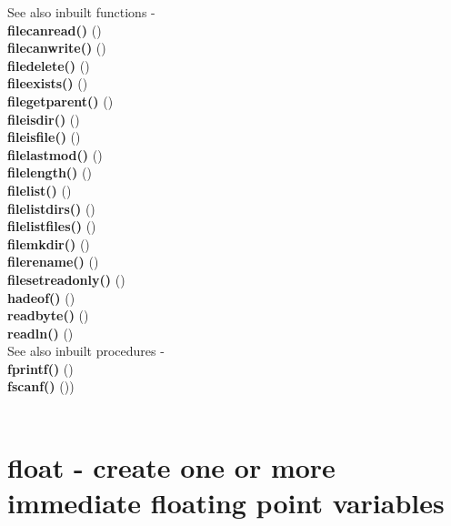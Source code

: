         See also inbuilt functions - \\
        {\bf filecanread()}      () \\
        {\bf filecanwrite()}     () \\
        {\bf filedelete()}       () \\
        {\bf fileexists()}       () \\
        {\bf filegetparent()}    () \\
        {\bf fileisdir()}        () \\
        {\bf fileisfile()}       () \\
        {\bf filelastmod()}      () \\
        {\bf filelength()}       () \\
        {\bf filelist()}         () \\
        {\bf filelistdirs()}     () \\
        {\bf filelistfiles()}    () \\
        {\bf filemkdir()}        () \\
        {\bf filerename()}       () \\
        {\bf filesetreadonly()}  () \\
        {\bf hadeof()}           () \\
        {\bf readbyte()}         () \\
        {\bf readln()}           () \\
        
        See also inbuilt procedures - \\
        {\bf fprintf()}          () \\
        {\bf fscanf()}           ()) \\ \\
 


    \section{float - create one or more immediate floating point variables}\label{sec:ipfloat}
        
